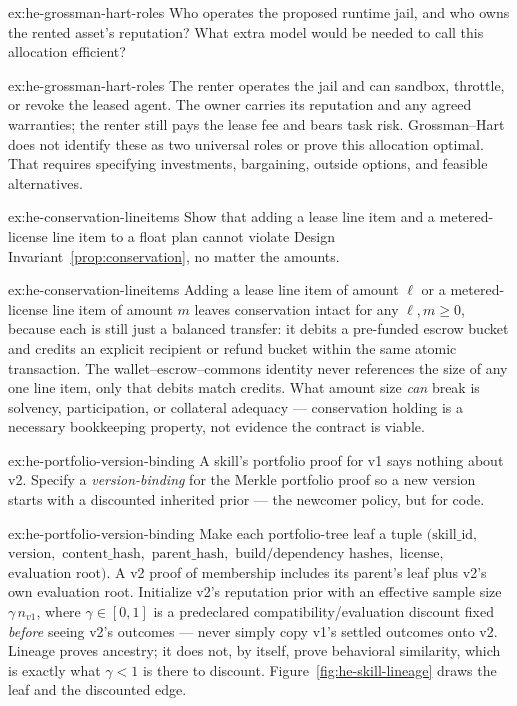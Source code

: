 \documentclass[11pt,a4paper]{article}
\theoremstyle{definition}
\theoremstyle{definition}
\theoremstyle{remark}
\begin{document}
\begin{pdexercise}[kind=Check,rating=1]{ex:he-grossman-hart-roles}
Who operates the proposed runtime jail, and who owns the rented asset's
reputation? What extra model would be needed to call this allocation efficient?
\end{pdexercise}
\begin{pdsolution}{ex:he-grossman-hart-roles}
The renter operates the jail and can sandbox, throttle, or revoke the leased
agent. The owner carries its reputation and any agreed warranties; the renter
still pays the lease fee and bears task risk. Grossman--Hart does not identify
these as two universal roles or prove this allocation optimal. That requires
specifying investments, bargaining, outside options, and feasible alternatives.
\end{pdsolution}
\begin{pdexercise}[kind=Trace,rating=2]{ex:he-conservation-lineitems}
Show that adding a lease line item and a metered-license line item to a float
  plan cannot violate Design Invariant~\ref{prop:conservation}, no matter the amounts.
\end{pdexercise}
\begin{pdsolution}{ex:he-conservation-lineitems}
Adding a lease line item of amount $\ell$ or a metered-license line item of
amount $m$ leaves conservation intact for any $\ell,m\ge0$, because each is still
just a balanced transfer: it debits a pre-funded escrow bucket and credits an
explicit recipient or refund bucket within the same atomic transaction. The
wallet--escrow--commons identity never references the size of any one line item,
only that debits match credits. What amount size \emph{can} break is solvency,
participation, or collateral adequacy --- conservation holding is a necessary
bookkeeping property, not evidence the contract is viable.
\end{pdsolution}
\begin{pdexercise}[kind=Open,rating=3]{ex:he-portfolio-version-binding}
A skill's portfolio proof for v1 says nothing about v2. Specify a
  \emph{version-binding} for the Merkle portfolio proof so a new version starts
  with a discounted inherited prior --- the newcomer policy, but for code.
\end{pdexercise}
\begin{pdsolution}{ex:he-portfolio-version-binding}
Make each portfolio-tree leaf a tuple $(\text{skill\_id},$ $\text{version},$
$\text{content\_hash},$ $\text{parent\_hash},$ $\text{build/dependency hashes},$
$\text{license},$ $\text{evaluation root})$. A v2 proof of membership includes its
parent's leaf plus v2's own evaluation root. Initialize v2's reputation prior
with an effective sample size $\gamma\, n_{v1}$, where $\gamma\in[0,1]$ is a
predeclared compatibility/evaluation discount fixed \emph{before} seeing v2's
outcomes --- never simply copy v1's settled outcomes onto v2. Lineage proves
ancestry; it does not, by itself, prove behavioral similarity, which is exactly
what $\gamma<1$ is there to discount. Figure~\ref{fig:he-skill-lineage} draws
the leaf and the discounted edge.


\end{pdsolution}
\end{document}
